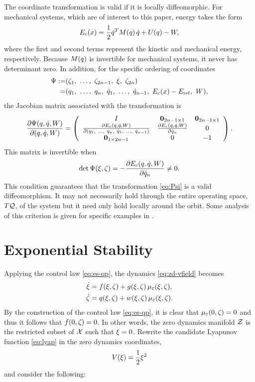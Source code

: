 %
The coordinate transformation is valid if it is locally diffeomorphic.
%
For mechanical systems, which are of interest to this paper, energy takes the
form
%
\begin{align}
  \label{eq:mech-sys-nrg}
  E_{c}(x) = \frac{1}{2} \dot{q}^{T} M(q) \, \dot{q} + U(q) - W,
\end{align}
%
where the first and second terms represent the kinetic and mechanical energy,
respectively.
%
Because $M(q)$ is invertible for mechanical systems, it never has determinant
zero.
%
In addition, for the specific ordering of coordinates
\begin{align*}
  \Psi :=& (\zdz_{1}, \ \ldots, \ \zdz_{2n-1}, \ \zdx, \ \zdz_{2n})\\
  =& (\q_{1}, \ \ldots, \ \q_{n}, \ \dq_{1}, \ \ldots, \ \dq_{n-1}, \ \Ec\arx -
  \Eref, \ \W),
\end{align*}
the Jacobian matrix
associated with the transformation is
\begin{align}
  \label{eq:Psi}
  \frac{\partial{\Psi(q, \dot{q}, W)}}{\partial{(q, \dot{q}, W)}} =
  \left(\begin{array}{c c c}
    I & {\mathbf 0}_{2n-1 \times 1} & {\mathbf 0}_{2n-1 \times 1}\\
    \frac{\partial{E_{c}(q, \dot{q}, W)}}{\partial{(q_{1}, \ \ldots, \ q_{n}, \ \dot{q}_{1}, \ \ldots, \ \dot{q}_{n-1})}} & \frac{\partial{E_{c}(q, \dot{q}, W)}}{\partial{\dot{q}_{n}}} & 0\\
    {\mathbf 0}_{1 \times 2n-1} & 0 & -1
  \end{array}\right).
\end{align}
%
This matrix is invertible when
\begin{align*}
  \det \Psi(\xi, \zeta) = -\frac{\partial{E_{c}(q, \dot{q}, W)}}{\partial{\dot{q}_{n}}} \neq 0.
\end{align*}
%
This condition guarantees that the transformation \eqref{eq:Psi} is a valid
diffeomorphism.
%
It may not necessarily hold through the entire operating space, $T\mathcal{Q}$, of the
system but it need only hold locally around the orbit.
%
Some analysis of this criterion is given for specific examples in
.

\section{Exponential Stability}

Applying the control law \eqref{eq:es-qp}, the dynamics \eqref{eq:zd-vfield}
becomes
\begin{align}
  \nonumber
  \dot {\xi} &= f(\xi, \zeta) + g(\xi, \zeta) \, \mu_{\varepsilon}(\xi, \zeta),\\
  \dot {\zeta} &= q(\xi, \zeta) + w(\xi, \zeta) \, \mu_{\varepsilon}(\xi, \zeta).
  \label{eq:zd-vfield-cl}
\end{align}
%
By the construction of the control law \eqref{eq:es-qp}, it is clear that
$\mu_{\varepsilon}(0, \zeta) = 0$ and thus it follows that $f(0, \zeta) = 0$.
%
In other words, the zero dynamics manifold $\mathcal{Z}$ is the restricted
subset of $\mathcal{X}$ such that $\xi = 0$.
%
Rewrite the candidate Lyapunov function \eqref{eq:lyap} in the zero dynamics
coordinates,
%
\begin{align*}
  V(\xi) = \frac{1}{2} \xi^{2}
\end{align*}
and consider the following:\vgap

